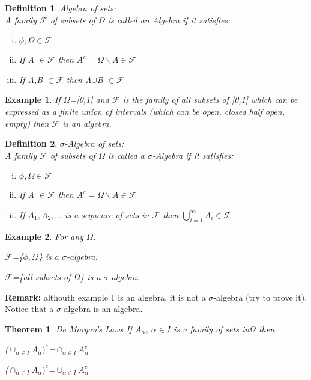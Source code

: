 \documentclass[12pt]{article}
\newtheorem{theorem}{Theorem}
\newtheorem{mydef}{Definition}
\newtheorem{example}{Example}
\begin{document}
\begin{mydef}{Algebra of sets:} \\ A family $\mathcal{F}$ of subsets of $\Omega$ is called an Algebra if it satisfies:
\begin{enumerate}[(i)]
  \item $\phi, \Omega \in \mathcal{F}$
  \item If A $\in \mathcal{F}$ then $A^{c}= \Omega \backslash A \in \mathcal{F}$
  \item If A,B $\in \mathcal{F}$ then A$\cup$B $\in \mathcal{F}$
\end{enumerate}
 \end{mydef}

\begin{example} If $\Omega$=[0,1] and $\mathcal{F}$ is the family of all subsets of [0,1] which can be expressed as a finite union of intervals (which can be open, closed half open, empty) then $\mathcal{F}$ is an algebra. \end{example}

\begin{mydef}{$\sigma$-Algebra of sets:} \\ A family $\mathcal{F}$ of subsets of $\Omega$ is called a $\sigma$-Algebra if it satisfies:
\begin{enumerate}[(i)]
  \item $\phi, \Omega \in \mathcal{F}$
  \item If A $\in \mathcal{F}$ then $A^{c}= \Omega \backslash A \in \mathcal{F}$
  \item If $A_1,A_2,\dots$ is a sequence of sets in $\mathcal{F}$ then $\bigcup_{i=1}^{\infty} A_{i} \in \mathcal{F}$
\end{enumerate}
 \end{mydef}

\begin{example} 
For any $\Omega$.
\item $\mathcal{F}$=\{$\phi,\Omega$\} is a $\sigma$-algebra.
\item $\mathcal{F}$=\{all subsets of $\Omega$\} is a $\sigma$-algebra.
\end{example}

{\bf Remark:} althouth example 1 is an algebra, it is not a $\sigma$-algebra (try to prove it). Notice that a $\sigma$-algebra is an algebra. 
\vspace{20pt}
\begin{theorem}{De Morgan's Laws} If $A_{\alpha}$, $\alpha \in I$ is a family of sets in$\Omega$ then
\item ($\cup_{\alpha \in I}A_{\alpha})^{c}$=$\cap_{\alpha \in I}A_{\alpha}^{c}$
\item ($\cap_{\alpha \in I}A_{\alpha})^{c}$=$\cup_{\alpha \in I}A_{\alpha}^{c}$
\end{theorem}
\end{document}
